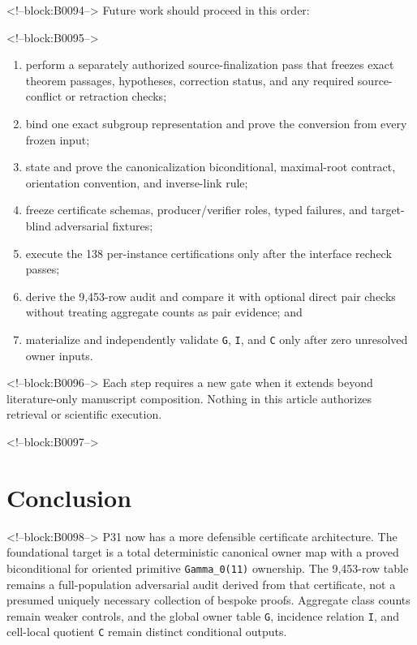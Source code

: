 \documentclass[11pt]{article}
\providecommand{\tightlist}{\setlength{\itemsep}{0pt}\setlength{\parskip}{0pt}}
\begin{document}
<!--block:B0094-->
Future work should proceed in this order:

<!--block:B0095-->
\begin{enumerate}
\def\labelenumi{\arabic{enumi}.}
\tightlist
\item
  perform a separately authorized source-finalization pass that freezes
  exact theorem passages, hypotheses, correction status, and any
  required source-conflict or retraction checks;
\item
  bind one exact subgroup representation and prove the conversion from
  every frozen input;
\item
  state and prove the canonicalization biconditional, maximal-root
  contract, orientation convention, and inverse-link rule;
\item
  freeze certificate schemas, producer/verifier roles, typed failures,
  and target-blind adversarial fixtures;
\item
  execute the 138 per-instance certifications only after the interface
  recheck passes;
\item
  derive the 9,453-row audit and compare it with optional direct pair
  checks without treating aggregate counts as pair evidence; and
\item
  materialize and independently validate \texttt{G}, \texttt{I}, and
  \texttt{C} only after zero unresolved owner inputs.
\end{enumerate}

<!--block:B0096-->
Each step requires a new gate when it extends beyond literature-only
manuscript composition. Nothing in this article authorizes retrieval or
scientific execution.

<!--block:B0097-->
\hypertarget{10-conclusion}{%
\section{Conclusion}\label{10-conclusion}}

<!--block:B0098-->
P31 now has a more defensible certificate architecture. The foundational
target is a total deterministic canonical owner map with a proved
biconditional for oriented primitive \texttt{Gamma\_0(11)} ownership.
The 9,453-row table remains a full-population adversarial audit derived
from that certificate, not a presumed uniquely necessary collection of
bespoke proofs. Aggregate class counts remain weaker controls, and the
global owner table \texttt{G}, incidence relation \texttt{I}, and
cell-local quotient \texttt{C} remain distinct conditional outputs.
\end{document}
